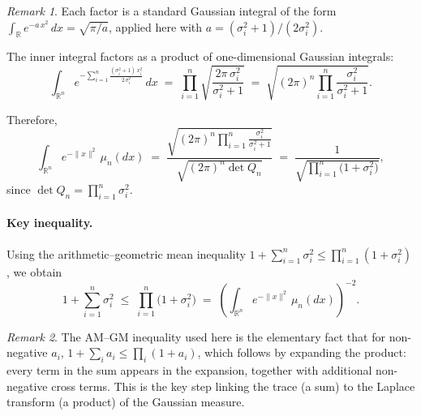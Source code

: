 \documentclass[11pt]{article}
\theoremstyle{definition}
\theoremstyle{remark}
\newtheorem{remark}{Remark}
\begin{document}
\begin{remark}
Each factor is a standard Gaussian integral of the form $\int_{\mathbb{R}} e^{-a\,x^2}\,dx = \sqrt{\pi/a}$, applied here with $a = (\sigma_i^2 + 1)/(2\sigma_i^2)$.
\end{remark}
The inner integral factors as a product of one-dimensional Gaussian integrals:
\[
    \int_{\mathbb{R}^n}
    e^{-\sum_{i=1}^{n} \frac{(\sigma_i^2 + 1)\,x_i^2}
                              {2\,\sigma_i^2}}\,dx
    \;=\;
    \prod_{i=1}^{n}
    \sqrt{\frac{2\pi\,\sigma_i^2}{\sigma_i^2 + 1}}
    \;=\;
    \sqrt{(2\pi)^n \prod_{i=1}^{n}
          \frac{\sigma_i^2}{\sigma_i^2 + 1}}.
\]

Therefore,
\[
    \int_{\mathbb{R}^n} e^{-\|x\|^2}\,\mu_n(dx)
    \;=\;
    \frac{
      \sqrt{(2\pi)^n \displaystyle\prod_{i=1}^{n}
            \frac{\sigma_i^2}{\sigma_i^2 + 1}}
    }{
      \sqrt{(2\pi)^n \det Q_n}
    }
    \;=\;
    \frac{1}{\sqrt{\displaystyle\prod_{i=1}^{n}
          \bigl(1 + \sigma_i^2\bigr)}},
\]
since $\det Q_n = \prod_{i=1}^{n} \sigma_i^2$.

\paragraph{Key inequality.}
Using the arithmetic--geometric mean inequality
$1 + \sum_{i=1}^{n} \sigma_i^2 \le \prod_{i=1}^{n}(1 + \sigma_i^2)$,
we obtain
\[
    1 + \sum_{i=1}^{n} \sigma_i^2
    \;\le\;
    \prod_{i=1}^{n} \bigl(1 + \sigma_i^2\bigr)
    \;=\;
    \left(\int_{\mathbb{R}^n} e^{-\|x\|^2}\,\mu_n(dx)\right)^{-2}.
\]

\begin{remark}
The AM--GM inequality used here is the elementary fact that for non-negative $a_i$,
$1 + \sum_i a_i \le \prod_i (1 + a_i)$,
which follows by expanding the product: every term in the sum appears in the expansion, together with additional non-negative cross terms.  This is the key step linking the trace (a sum) to the Laplace transform (a product) of the Gaussian measure.
\end{remark}

\end{document}
